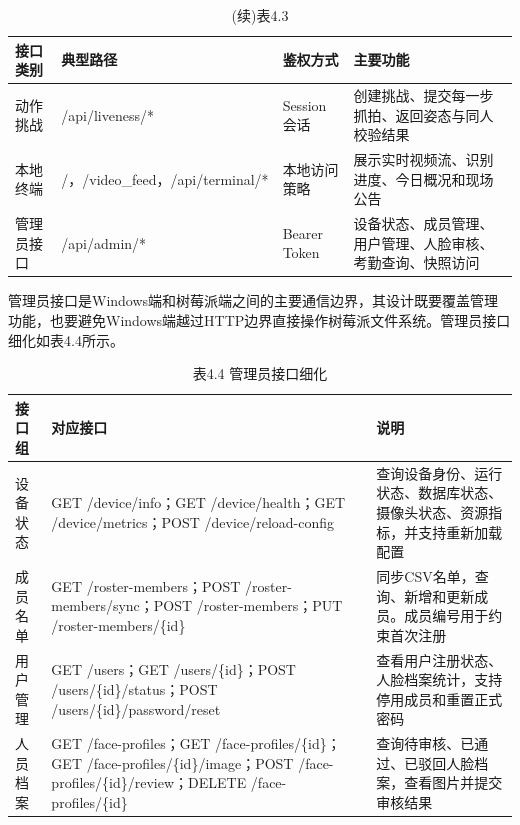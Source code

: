 \documentclass[UTF8]{heuthesis}
\begin{document}
\begingroup
\small
\begin{longtable}{|>{\raggedright\arraybackslash}p{}|>{\raggedright\arraybackslash}p{}|>{\raggedright\arraybackslash}p{}|>{\raggedright\arraybackslash}p{}|}
\caption{(续)表4.3}\\
\hline
接口类别 & 典型路径 & 鉴权方式 & 主要功能 \\
\hline
动作挑战 & /api/liveness/* & Session会话 & 创建挑战、提交每一步抓拍、返回姿态与同人校验结果 \\
\hline
本地终端 & /，/video\_feed，/api/terminal/* & 本地访问策略 & 展示实时视频流、识别进度、今日概况和现场公告 \\
\hline
管理员接口 & /api/admin/* & Bearer Token & 设备状态、成员管理、用户管理、人脸审核、考勤查询、快照访问 \\
\hline
\end{longtable}
\endgroup

管理员接口是Windows端和树莓派端之间的主要通信边界，其设计既要覆盖管理功能，也要避免Windows端越过HTTP边界直接操作树莓派文件系统。管理员接口细化如表4.4所示。

\begingroup
\small
\begin{longtable}{|>{\raggedright\arraybackslash}p{}|>{\raggedright\arraybackslash}p{}|>{\raggedright\arraybackslash}p{}|}
\caption{表4.4 管理员接口细化}\\
\hline
接口组 & 对应接口 & 说明 \\
\hline
设备状态 & GET /device/info；GET /device/health；GET /device/metrics；POST /device/reload-config & 查询设备身份、运行状态、数据库状态、摄像头状态、资源指标，并支持重新加载配置 \\
\hline
成员名单 & GET /roster-members；POST /roster-members/sync；POST /roster-members；PUT /roster-members/\{id\} & 同步CSV名单，查询、新增和更新成员。成员编号用于约束首次注册 \\
\hline
用户管理 & GET /users；GET /users/\{id\}；POST /users/\{id\}/status；POST /users/\{id\}/password/reset & 查看用户注册状态、人脸档案统计，支持停用成员和重置正式密码 \\
\hline
人员档案 & GET /face-profiles；GET /face-profiles/\{id\}；GET /face-profiles/\{id\}/image；POST /face-profiles/\{id\}/review；DELETE /face-profiles/\{id\} & 查询待审核、已通过、已驳回人脸档案，查看图片并提交审核结果 \\
\hline
\end{longtable}
\endgroup
\end{document}
